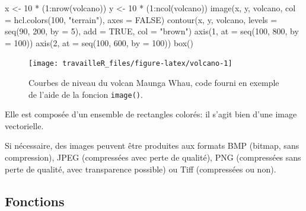 \documentclass[
  11pt,
  french,
  a4paper,
  extrafontsizes,onecolumn,openright
  ]{memoir}
\newenvironment{Shaded}{\begin{snugshade}}{\end{snugshade}}
\newcommand{\AttributeTok}[1]{\textcolor[rgb]{0.77,0.63,0.00}{#1}}
\newcommand{\ConstantTok}[1]{\textcolor[rgb]{0.00,0.00,0.00}{#1}}
\newcommand{\DecValTok}[1]{\textcolor[rgb]{0.00,0.00,0.81}{#1}}
\newcommand{\FunctionTok}[1]{\textcolor[rgb]{0.00,0.00,0.00}{#1}}
\newcommand{\NormalTok}[1]{#1}
\newcommand{\OtherTok}[1]{\textcolor[rgb]{0.56,0.35,0.01}{#1}}
\newcommand{\SpecialCharTok}[1]{\textcolor[rgb]{0.00,0.00,0.00}{#1}}
\newcommand{\StringTok}[1]{\textcolor[rgb]{0.31,0.60,0.02}{#1}}
\begin{document}
\begin{Shaded}
\begin{Highlighting}[]
\NormalTok{x }\OtherTok{\textless{}{-}} \DecValTok{10} \SpecialCharTok{*}\NormalTok{ (}\DecValTok{1}\SpecialCharTok{:}\FunctionTok{nrow}\NormalTok{(volcano))}
\NormalTok{y }\OtherTok{\textless{}{-}} \DecValTok{10} \SpecialCharTok{*}\NormalTok{ (}\DecValTok{1}\SpecialCharTok{:}\FunctionTok{ncol}\NormalTok{(volcano))}
\FunctionTok{image}\NormalTok{(x, y, volcano, }\AttributeTok{col =} \FunctionTok{hcl.colors}\NormalTok{(}\DecValTok{100}\NormalTok{, }\StringTok{"terrain"}\NormalTok{), }\AttributeTok{axes =} \ConstantTok{FALSE}\NormalTok{)}
\FunctionTok{contour}\NormalTok{(x, y, volcano, }\AttributeTok{levels =} \FunctionTok{seq}\NormalTok{(}\DecValTok{90}\NormalTok{, }\DecValTok{200}\NormalTok{, }\AttributeTok{by =} \DecValTok{5}\NormalTok{), }\AttributeTok{add =} \ConstantTok{TRUE}\NormalTok{, }
    \AttributeTok{col =} \StringTok{"brown"}\NormalTok{)}
\FunctionTok{axis}\NormalTok{(}\DecValTok{1}\NormalTok{, }\AttributeTok{at =} \FunctionTok{seq}\NormalTok{(}\DecValTok{100}\NormalTok{, }\DecValTok{800}\NormalTok{, }\AttributeTok{by =} \DecValTok{100}\NormalTok{))}
\FunctionTok{axis}\NormalTok{(}\DecValTok{2}\NormalTok{, }\AttributeTok{at =} \FunctionTok{seq}\NormalTok{(}\DecValTok{100}\NormalTok{, }\DecValTok{600}\NormalTok{, }\AttributeTok{by =} \DecValTok{100}\NormalTok{))}
\FunctionTok{box}\NormalTok{()}
\end{Highlighting}
\end{Shaded}

\begin{figure}

{\centering \texttt{[image: travailleR\_files/figure-latex/volcano-1]} 

}

\caption{Courbes de niveau du volcan Maunga Whau, code fourni en exemple de l'aide de la foncion \texttt{image()}.}\label{fig:volcano}
\end{figure}

\normalsize

Elle est composée d'un ensemble de rectangles colorés: il s'agit bien d'une image vectorielle.

Si nécessaire, des images peuvent être produites aux formats BMP (bitmap, sans compression), JPEG (compressées avec perte de qualité), PNG (compressées sans perte de qualité, avec transparence possible) ou Tiff (compressées ou non).

\hypertarget{fonctions}{%
\subsection{Fonctions}\label{fonctions}}
\end{document}
